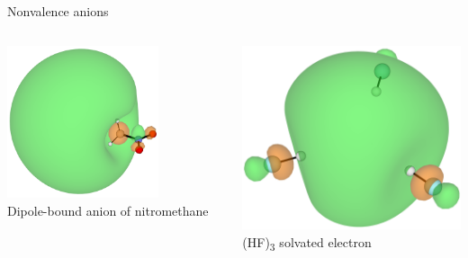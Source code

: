 \documentclass[9pt,t,xcolor=table]{beamer}
\begin{document}
\begin{frame}{\huge Nonvalence anions}
\begin{columns}
\begin{column}{0.3\textwidth}
			\includegraphics[width=0.7\textwidth]{Figs/MeNO2_DBS.png}\\
			\vspace{3pt}
    		\small Dipole-bound anion of nitromethane
		\end{column}
		\begin{column}{0.27\textwidth}
			\centering
			\includegraphics[width=\textwidth]{Figs/hf3.png}\\
			\vspace{3pt}
			\small (HF)\textsubscript{3} solvated electron
		\end{column}	
	\end{columns}
\end{frame}
\end{document}
